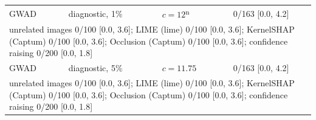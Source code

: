 \begin{footnotesize}
\begin{longtable}{p{1.6cm}p{2.6cm}p{2.8cm}p{4.6cm}}
GWAD & diagnostic, 1\% & $c=12$\textsuperscript{n} & 0/163 [0.0, 4.2] \\
\multicolumn{4}{p{12.8cm}}{\raggedright\quad unrelated images 0/100 [0.0, 3.6]; LIME (lime) 0/100 [0.0, 3.6]; KernelSHAP (Captum) 0/100 [0.0, 3.6]; Occlusion (Captum) 0/100 [0.0, 3.6]; confidence raising 0/200 [0.0, 1.8]} \\[4pt]
GWAD & diagnostic, 5\% & $c=11.75$ & 0/163 [0.0, 4.2] \\
\multicolumn{4}{p{12.8cm}}{\raggedright\quad unrelated images 0/100 [0.0, 3.6]; LIME (lime) 0/100 [0.0, 3.6]; KernelSHAP (Captum) 0/100 [0.0, 3.6]; Occlusion (Captum) 0/100 [0.0, 3.6]; confidence raising 0/200 [0.0, 1.8]} \\[4pt]
\bottomrule
\end{longtable}
\end{footnotesize}
